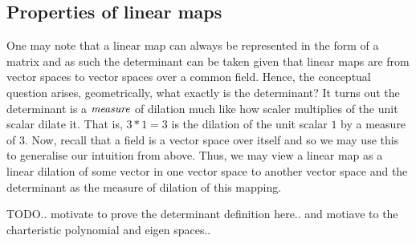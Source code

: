\subsection{Properties of linear maps}
One may note that a linear map can always be represented in the form of a matrix and as such
the determinant can be taken given that linear maps are from vector spaces to vector spaces
over a common field.
Hence, the conceptual question arises, geometrically, what exactly is the determinant? It
turns out the determinant is a $\emph{measure}$ of dilation much like how scaler multiplies
of the unit scalar dilate it. That is, $3*1=3$ is the dilation of the unit scalar $1$ by a
measure of $3$. Now, recall that a field is a vector space over itself and so we may use this
to generalise our intuition from above. Thus, we may view a linear map as a linear dilation
of some vector in one vector space to another vector space and the determinant as the measure
of dilation of this mapping.

TODO.. motivate to prove the determinant definition here.. and motiave to the charteristic polynomial
and eigen spaces..
